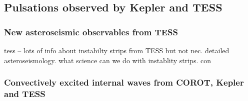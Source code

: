 {\color{blue}
\subsection{Pulsations observed by Kepler and TESS}



\subsubsection{New asteroseismic observables from TESS}

tess -- lots of info about instabilty strips from TESS but not nec. detailed asteroseismology.  what science can we do with instablity strips.   con

\subsubsection{Convectively excited internal waves from COROT, Kepler and TESS}


}